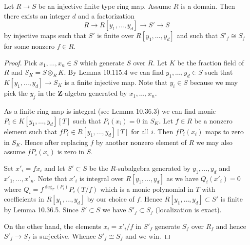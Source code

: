 \begin{lemma}
Let $R\to S$ be an injective finite type ring map. Assume $R$ is a domain. Then there exists an integer $d$ and a factorization
\[R\to R[y_1,\ldots,y_d]\to S'\to S\]
by injective maps such that $S'$ is finite over $R[y_1,\ldots,y_d]$ and such that $S'_f\cong S_f$ for some nonzero $f\in R$.
\end{lemma}
\begin{proof}
Pick $x_1,\ldots,x_n\in S$ which generate $S$ over $R$. Let $K$ be the fraction field of $R$ and $S_K=S\otimes_RK$. By Lemma 10.115.4 we can find $y_1,\ldots,y_d\in S$ such that $K[y_1,\ldots,y_d]\to S_K$ is a finite injective map. Note that $y_i\in S$ because we may pick the $y_j$ in the $\mathbf Z$-algebra generated by $x_1,\ldots,x_n$.

As a finite ring map is integral (see Lemma 10.36.3) we can find monic $P_i\in K[y_1,\ldots,y_d][T]$ such that $P_i(x_i)=0$ in $S_K$. Let $f\in R$ be a nonzero element such that $fP_i\in R[y_1,\ldots,y_d][T]$ for all $i$. Then $fP_i(x_i)$ maps to zero in $S_K$. Hence after replacing $f$ by another nonzero element of $R$ we may also assume $fP_i(x_i)$ is zero in $S$.

Set $x'_i=fx_i$ and let $S'\subset S$ be the $R$-subalgebra generated by $y_1,\ldots,y_d$ and $x'_1,\ldots,x'_n$. Note that $x'_i$ is integral over $R[y_1,\ldots,y_d]$ as we have $Q_i(x'_i)=0$ where $Q_i=f^{\deg_T(P_i)}P_i(T/f)$ which is a monic polynomial in $T$ with coefficients in $R[y_1,\ldots,y_d]$ by our choice of $f$. Hence $R[y_1,\ldots,y_d]\subset S'$ is finite by Lemma 10.36.5. Since $S'\subset S$ we have $S'_f\subset S_f$ (localization is exact).

On the other hand, the elements $x_i=x'_i/f$ in $S'_f$ generate $S_f$ over $R_f$ and hence $S'_f\to S_f$ is surjective. Whence $S'_f\cong S_f$ and we win.
\end{proof}


